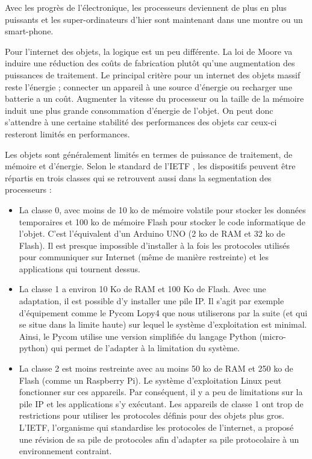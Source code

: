   \vspace{1em}

Avec les progrès de l’électronique, les processeurs deviennent de plus en plus puissants et les super-ordinateurs d’hier sont maintenant dans une montre ou un smart-phone. 

Pour l’internet des objets, la logique est un peu différente. La loi de Moore va induire une réduction des coûts de fabrication plutôt qu'une augmentation des puissances de traitement. Le principal critère pour un internet des objets massif reste l’énergie ; connecter un appareil à une source d’énergie ou recharger une batterie a un coût. Augmenter la vitesse du processeur ou la taille de la mémoire induit une plus grande consommation d’énergie de l'objet. On peut donc s’attendre à une certaine stabilité des performances des objets car ceux-ci resteront limités en performances.

Les objets sont généralement limités en termes de puissance de traitement, de mémoire et d’énergie. Selon le standard de l’IETF , les dispositifs peuvent être répartis en trois classes qui se retrouvent aussi dans la segmentation des processeurs :

\begin{itemize}
\item La classe 0, avec moins de 10 ko de mémoire volatile pour stocker les données temporaires et 100 ko de mémoire Flash pour stocker le code informatique de l'objet. C'est l’équivalent d’un Arduino UNO (2 ko de RAM et 32 ko de Flash). Il est presque impossible d’installer à la fois les protocoles utilisés pour communiquer sur Internet (même de manière restreinte) et les applications qui tournent dessus. 
\item La classe 1 a environ 10 Ko de RAM et 100 Ko de Flash. Avec une adaptation, il est possible d’y installer une pile IP. Il s'agit par exemple d'équipement comme le Pycom Lopy4 que nous utiliserons par la suite (et qui se situe dans la limite haute) sur lequel le système d'exploitation est minimal. Ainsi, le Pycom utilise une version simplifiée du langage Python (micro-python) qui permet de l'adapter à la limitation du système.
\item La classe 2 est moins restreinte avec au moins 50 ko de RAM et 250 ko de Flash (comme un Raspberry Pi). Le système d’exploitation Linux peut fonctionner sur ces appareils. Par conséquent, il y a peu de limitations sur la pile IP et les applications s’y exécutant.
Les appareils de classe 1 ont trop de restrictions pour utiliser les protocoles définis pour des objets plus gros. L’\ac{IETF}, l'organisme qui standardise les protocoles de l'internet, a proposé une révision de sa pile de protocoles afin d’adapter sa pile protocolaire à un environnement contraint.
\end{itemize}


